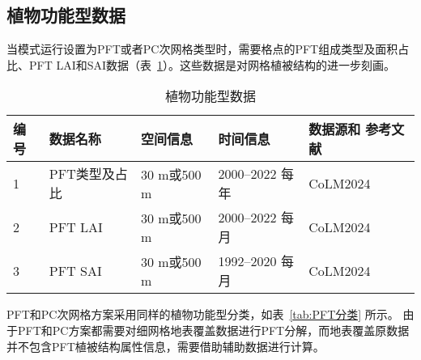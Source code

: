 \subsection{植物功能型数据}\label{植物功能型数据}

当模式运行设置为PFT或者PC次网格类型时，需要格点的PFT组成类型及面积占比、PFT LAI和SAI数据（表~\ref{tab:PFT数据}）。这些数据是对网格植被结构的进一步刻画。

\begin{table}[htbp]
  \begin{threeparttable}
    \centering
    \caption{植物功能型数据}
    \label{tab:PFT数据}
    \begin{tabular}{p{1cm}p{3.5cm}p{3cm}p{3cm}p{3cm}}
      \toprule
      编号 & 数据名称      & 空间信息    & 时间信息                 & 数据源和 \newline 参考文献 \\
      \midrule
      1    & PFT类型及占比 & 30 m或500 m & 2000--2022 \newline 每年 & CoLM2024                   \\
      2    & PFT LAI       & 30 m或500 m & 2000--2022 \newline 每月 & CoLM2024                   \\
      3    & PFT SAI       & 30 m或500 m & 1992--2020 \newline 每月 & CoLM2024                   \\
      \bottomrule
    \end{tabular}
  \end{threeparttable}
\end{table}

PFT和PC次网格方案采用同样的植物功能型分类，如表~\ref{tab:PFT分类} 所示。
由于PFT和PC方案都需要对细网格地表覆盖数据进行PFT分解，而地表覆盖原数据并不包含PFT植被结构属性信息，需要借助辅助数据进行计算。

